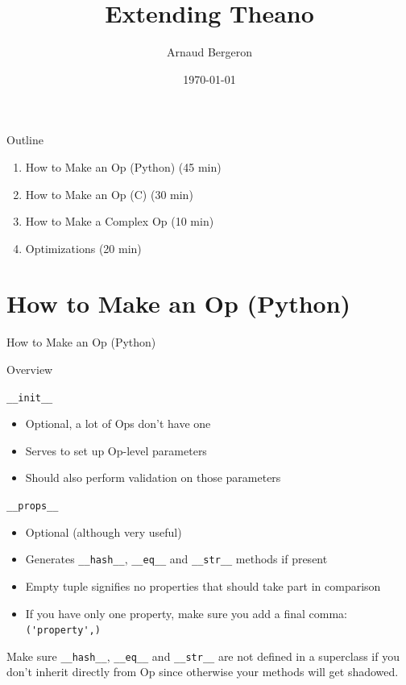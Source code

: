 \documentclass[utf8x]{beamer}
\title{Extending Theano}
\author{Arnaud Bergeron}
\date{\today}
\newcommand{\code}[1]{\lstinline[emph={[2]}]|#1|}
\begin{document}
\frame[plain]{\titlepage}

\section*{}

\begin{frame}{Outline}
\begin{enumerate}
\item How to Make an Op (Python) (45 min)
\item How to Make an Op (C) (30 min)
\item How to Make a Complex Op (10 min)
\item Optimizations (20 min)
\end{enumerate}
\end{frame}

\section{How to Make an Op (Python)}

\begin{frame}[plain]{}
\begin{center}
\Huge How to Make an Op (Python)
\end{center}
\end{frame}

\begin{frame}[fragile]{Overview}

\end{frame}

\begin{frame}{\code{__init__}}

\begin{itemize}
\item Optional, a lot of Ops don't have one
\item Serves to set up Op-level parameters
\item Should also perform validation on those parameters
\end{itemize}
\end{frame}

\begin{frame}{\code{__props__}}

\begin{itemize}
\item Optional (although very useful)
\item Generates \code{__hash__}, \code{__eq__} and \code{__str__} methods if present
\item Empty tuple signifies no properties that should take part in comparison
\item If you have only one property, make sure you add a final comma: \code{('property',)}
\end{itemize}
\begin{alertblock}{}
Make sure \code{__hash__}, \code{__eq__} and \code{__str__} are not defined in a superclass if you don't inherit directly from Op since otherwise your methods will get shadowed.
\end{alertblock}
\end{frame}
\end{document}
